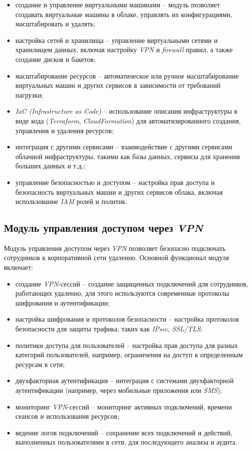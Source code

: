 \begin{itemize}
    \item создание и управление виртуальными машинами -- модуль позволяет создавать виртуальные машины в облаке, управлять их конфигурациями, масштабировать и удалять; 
    \item настройка сетей и хранилища -- управление виртуальными сетями и хранилищем данных, включая настройку \textit{VPN} и \textit{firewall} правил, а также создание дисков и бакетов; 
    \item масштабирование ресурсов -- автоматическое или ручное масштабирование виртуальных машин и других сервисов в зависимости от требований нагрузки; 
    \item \textit{IaC (Infrastructure as Code)} -- использование описания инфраструктуры в виде кода (\textit{Terraform}, \textit{CloudFormation}) для автоматизированного создания, управления и удаления ресурсов; 
    \item интеграция с другими сервисами -- взаимодействие с другими сервисами облачной инфраструктуры, такими как базы данных, сервисы для хранения больших данных и т.д.; 
    \item управление безопасностью и доступом -- настройка прав доступа и безопасность виртуальных машин и других сервисов облака, включая использование \textit{IAM} ролей и политик. 
\end{itemize}

\subsection{Модуль управления доступом через \textit{VPN}}
\label{sec:vpn_access_functionality}

Модуль управления доступом через \textit{VPN} позволяет безопасно подключать сотрудников к корпоративной сети удаленно. Основной функционал модуля включает:

\begin{itemize}
    \item создание \textit{VPN}-сессий -- создание защищенных подключений для сотрудников, работающих удаленно, для этого используются современные протоколы шифрования и аутентификации; 
    \item настройка шифрования и протоколов безопасности -- настройка протоколов безопасности для защиты трафика, таких как \textit{IPsec}, \textit{SSL/TLS}; 
    \item политики доступа для пользователей -- настройка прав доступа для разных категорий пользователей, например, ограничения на доступ к определенным ресурсам в сети; 
    \item двухфакторная аутентификация -- интеграция с системами двухфакторной аутентификации (например, через мобильные приложения или \textit{SMS}); 
    \item мониторинг \textit{VPN}-сессий -- мониторинг активных подключений, времени сеансов и использования ресурсов; 
    \item ведение логов подключений -- сохранение всех подключений и действий, выполненных пользователями в сети, для последующего анализа и аудита. 
\end{itemize}

